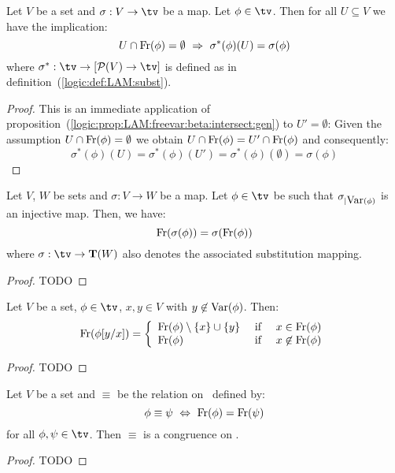 \begin{prop}\label{logic:prop:LAM:freevar:beta:intersect}
    Let $V$ be a set and $\sigma:V\to\tv$ be a map. Let $\phi\in\tv$.
    Then for all $U\subseteq V$ we have the implication:
        \[
            U\cap\free(\phi) = \emptyset
            \ \Rightarrow\ 
            \sigma^{*}(\phi)(U) = \sigma(\phi)
        \]
    where $\sigma^{*}:\tv\to[{\cal P}(V)\to\tv]$ is defined as in 
    definition~(\ref{logic:def:LAM:subst}).
\end{prop}
\begin{proof}
    This is an immediate application of 
    proposition~(\ref{logic:prop:LAM:freevar:beta:intersect:gen}) 
    to $U'=\emptyset$: Given the assumption $U\cap\mbox{\rm Fr}(\phi) = \emptyset$ 
    we obtain $U\cap\mbox{\rm Fr}(\phi)=U'\cap\mbox{\rm Fr}(\phi)$ and consequently:
        \[
            \sigma^{*}(\phi)(U)=\sigma^{*}(\phi)(U')
            =\sigma^{*}(\phi)(\emptyset)=\sigma(\phi)
        \]
\end{proof}

\begin{prop}\label{logic:prop:LAM:freevar:of:substitution}
    Let $V$, $W$ be sets and $\sigma:V\to W$ be a map. Let $\phi\in\tv$ 
    be such that $\sigma_{|\mbox{\rm Var}(\phi)}$ is an injective map. Then, we have:
    \[
        \mbox{\rm Fr}(\sigma(\phi))=\sigma(\mbox{\rm Fr}(\phi))
    \]
    where $\sigma:\tv\to{\bf T}(W)$ also denotes the associated substitution 
    mapping.
\end{prop}
\begin{proof}
TODO
\end{proof}

\begin{prop}\label{logic:prop:LAM:freevar:single:subst}
    Let $V$ be a set, $\phi\in\tv$, $x,y\in V$ with $y\not\in\mbox{\rm Var}(\phi)$. Then:
    \[
        \mbox{\rm Fr}(\phi[y/x])=
            \left\{\begin{array}{lcl}
                \mbox{\rm Fr}(\phi)\setminus\{x\}\cup\{y\}
                    &\mbox{\ if\ }&
                x\in\mbox{\rm Fr}(\phi)
                \\
                \mbox{\rm Fr}(\phi)
                    &\mbox{\ if\ }&
                x\not\in\mbox{\rm Fr}(\phi)
            \end{array}\right.
    \]
\end{prop}
\begin{proof}
TODO
\end{proof}

\begin{prop}\label{logic:prop:LAM:congruence:freevar}
Let $V$ be a set and $\equiv$ be the relation on \tv\ defined by:
    \[
    \phi\equiv\psi\ \Leftrightarrow\ \free(\phi)=\free(\psi)
    \]
for all $\phi,\psi\in\tv$. Then $\equiv$ is a congruence on \tv.
\end{prop}
\begin{proof}
TODO
\end{proof}



